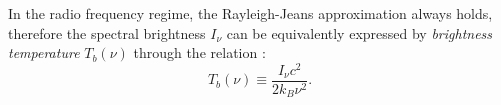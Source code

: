 \documentclass[modern]{aastex61}
\begin{document}
In the radio frequency regime, the Rayleigh-Jeans approximation
always holds, therefore the spectral brightness $I_{\nu}$ can be
equivalently expressed by \emph{brightness temperature} $T_b(\nu)$
through the relation \citep{condon2016}:
\begin{equation}
  \label{eq:brightness-temp}
  T_b(\nu) \equiv \frac{I_{\nu} c^2}{2 k_B \nu^2}.
\end{equation}





\end{document}
